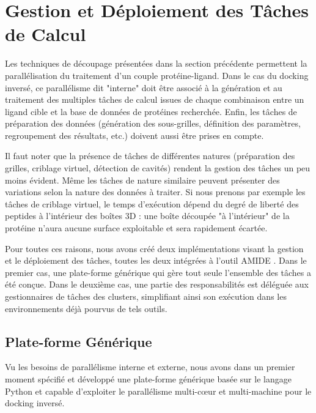 \section{Gestion et Déploiement des Tâches de Calcul}

Les techniques de découpage présentées dans la section précédente permettent la parallélisation du traitement d'un couple protéine-ligand. Dans le cas du docking inversé, ce parallélisme dit "interne" doit être associé à la génération et au traitement des multiples tâches de calcul issues de chaque combinaison entre un ligand cible et la base de données de protéines recherchée. Enfin, les tâches de préparation des données (génération des sous-grilles, définition des paramètres, regroupement des résultats, etc.) doivent aussi être prises en compte. 

Il faut noter que la présence de tâches de différentes natures (préparation des grilles, criblage virtuel, détection de cavités) rendent la gestion des tâches un peu moins évident. Même les tâches de nature similaire peuvent présenter des variations selon la nature des données à traiter. Si nous prenons par exemple les tâches de criblage virtuel, le temps d'exécution dépend du degré de liberté des peptides à l'intérieur des boîtes 3D : une boîte découpée "à l'intérieur" de la protéine n'aura aucune surface exploitable et sera rapidement écartée.    

Pour toutes ces raisons, nous avons créé deux implémentations visant la gestion et le déploiement des tâches, toutes les deux intégrées à l'outil AMIDE \cite{Vasseur2015}. Dans le premier cas, une plate-forme générique qui gère tout seule l'ensemble des tâches a été conçue. Dans le deuxième cas, une partie des responsabilités est déléguée aux gestionnaires de tâches des clusters, simplifiant ainsi son exécution dans les environnements déjà pourvus de tels outils.

\subsection{Plate-forme Générique}

Vu les besoins de parallélisme interne et externe, nous avons dans un premier moment spécifié et développé une plate-forme générique basée sur le langage Python et capable d'exploiter le parallélisme multi-c{\oe}ur et multi-machine pour le docking inversé. 

